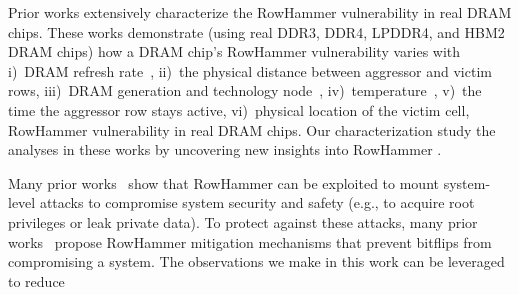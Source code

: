 {Prior work{s} extensively characterize the RowHammer vulnerability in real DRAM chips\understandingRowHammerAllCitations{}. These works {demonstrate {(}using real DDR3, DDR4, LPDDR4, and HBM2 DRAM chips{)} how a DRAM chip's RowHammer vulnerability varies with}
i)~DRAM refresh rate~\cite{hassan2021utrr,frigo2020trrespass,kim2014flipping}, ii)~the physical distance between aggressor and victim rows, iii)~DRAM generation and technology node~\cite{orosa2021deeper,kim2014flipping,kim2020revisiting,hassan2021utrr}, iv)~temperature~\cite{orosa2021deeper,park2016experiments}, v)~the time the aggressor row stays active, vi)~physical location of the victim cell,  RowHammer vulnerability in real DRAM chips. Our characterization study  the analyses in these works by uncovering new insights into RowHammer .}

{Many prior works~\exploitingRowHammerAllCitations{} show that RowHammer can be exploited to mount system-level attacks to compromise system security {and safety} (e.g., to acquire root privileges {or leak private data}).
To protect against these attacks,
{many prior works~\mitigatingRowHammerAllCitations{} propose RowHammer mitigation mechanisms that prevent bitflips from compromising a system.}
The observations {we make in this work} can be leveraged to reduce }



